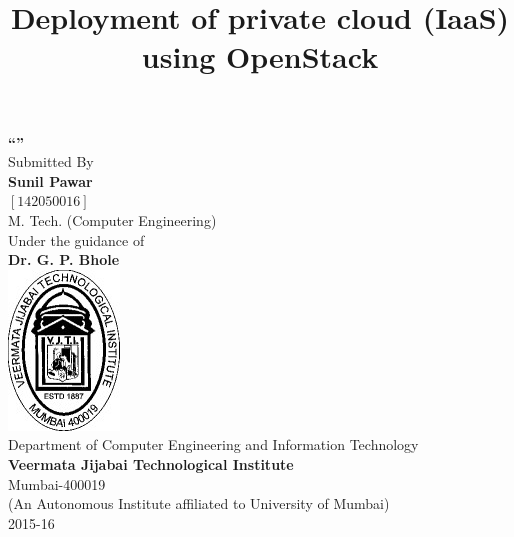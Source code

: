 \begin{titlepage}
\begin{center}
\vspace{0.1cm}
\vspace{0.3cm}
\title{Deployment of private cloud (IaaS) using OpenStack}
\makeatletter
\textbf{\LARGE \vspace{0.2cm}\textquotedblleft \@title \textquotedblright }\\
\vspace{0.3cm}
\Large Submitted By\\
\vspace{0.3cm}
\textbf{Sunil Pawar}\\
\vspace{0.1cm}
$[142050016]$\\
{M. Tech. (Computer Engineering)}\\
\vspace{0.5cm}
Under the guidance of\\
\vspace{0.2cm}
\textbf{Dr. G. P. Bhole}\\
\vspace{1cm}
\includegraphics{images/logo.jpg}\\
\vspace{0.3cm}
Department of Computer Engineering and Information Technology\\
\vspace{0.2cm}
\textbf{Veermata Jijabai Technological Institute}\\
\vspace{0.1cm}
Mumbai-400019\\
\vspace{0.2cm}
(An Autonomous Institute affiliated to University of Mumbai)\\
2015-16
\end{center}
\end{titlepage}
\makeatother